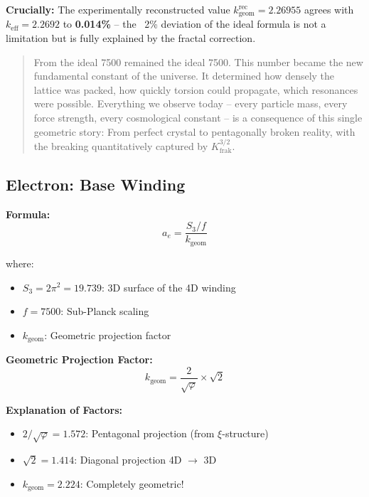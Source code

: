 	\textbf{Crucially:} The experimentally reconstructed value \(k_\text{geom}^\text{rec} = 2.26955\) agrees with $k_\text{eff} = 2.2692$ to \textbf{0.014\%} -- the ~2\% deviation of the ideal formula is not a limitation but is fully explained by the fractal correction.
	\begin{quotation}
		From the ideal 7500 remained the ideal 7500. This number became the new fundamental constant of the universe. It determined how densely the lattice was packed, how quickly torsion could propagate, which resonances were possible.
		Everything we observe today – every particle mass, every force strength, every cosmological constant – is a consequence of this single geometric story: From perfect crystal to pentagonally broken reality, with the breaking quantitatively captured by $K_\text{frak}^{3/2}$.
	\end{quotation}
	
	\subsection{Electron: Base Winding}
	
	\textbf{Formula:}
	\begin{equation}
		a_e = \frac{S_3/f}{k_{\text{geom}}}
		\label{eq:ae}
	\end{equation}
	
	where:
	\begin{itemize}
		\item $S_3 = 2\pi^2 = 19.739$: 3D surface of the 4D winding
		\item $f = 7500$: Sub-Planck scaling
		\item $k_{\text{geom}}$: Geometric projection factor
	\end{itemize}
	
	\textbf{Geometric Projection Factor:}
	\begin{equation}
		k_{\text{geom}} = \frac{2}{\sqrt{\varphi}} \times \sqrt{2}
		\label{eq:kgeom}
	\end{equation}
	
	\textbf{Explanation of Factors:}
	\begin{itemize}
		\item $2/\sqrt{\varphi} = 1.572$: Pentagonal projection (from $\xi$-structure)
		\item $\sqrt{2} = 1.414$: Diagonal projection 4D $\to$ 3D
		\item $k_{\text{geom}} = 2.224$: Completely geometric!
	\end{itemize}
	
